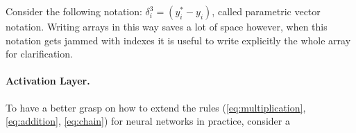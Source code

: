 Consider the following notation:
$
    \delta^3_i = (y^*_i - y_i)
$,
called parametric vector notation. Writing arrays in this way saves a lot of space however, when this notation gets jammed with indexes it is useful to write explicitly the whole array for clarification.

\paragraph{Activation Layer.} To have a better grasp on how to extend the rules (\ref{eq:multiplication}, \ref{eq:addition}, \ref{eq:chain}) for neural networks in practice, consider a 